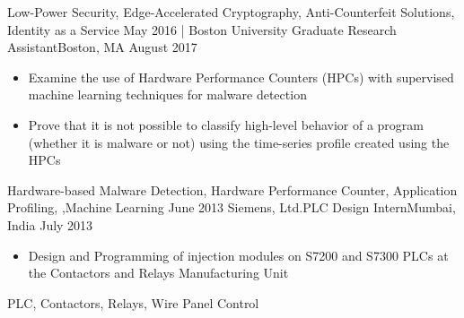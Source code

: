 \begin{experiences}
{\begin{itemize}
                      \end{itemize}
                    }
                    {Low-Power Security, Edge-Accelerated Cryptography, Anti-Counterfeit Solutions, Identity as a Service}
  \emptySeparator
  \experience
  {May 2016}       {| Boston University}{ Graduate Research Assistant}{Boston, MA}
  {August 2017}    {
                      \begin{itemize}
                        \item Examine the use of Hardware Performance Counters (HPCs) with supervised machine learning techniques for malware detection 
                        \item Prove that it is not possible to classify high-level behavior of a program (whether it is malware or not) using the time-series profile created using the HPCs \\
                      \end{itemize}
                    }
                    {Hardware-based Malware Detection, Hardware Performance Counter, Application Profiling, ,Machine Learning}
  \emptySeparator
  \experience
    {June 2013}     {Siemens, Ltd.}{PLC Design Intern}{Mumbai, India}
    {July 2013}    {
                      \begin{itemize}
                        \item Design and Programming of injection modules on S7200 and S7300 PLCs at the Contactors and Relays Manufacturing Unit \\
                      \end{itemize}
                    }
                    {PLC, Contactors, Relays, Wire Panel Control}         
\end{experiences}
